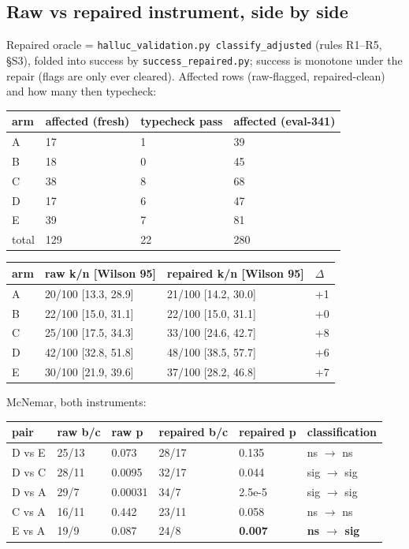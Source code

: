 \documentclass[10pt]{article}
\newcommand{\code}[1]{\texttt{#1}}
\newcommand{\best}[1]{\textbf{#1}}
\begin{document}
\subsection{Raw vs repaired instrument, side by side}\label{s2:rawrep}

Repaired oracle = \code{halluc\_validation.py classify\_adjusted}
(rules R1--R5, \S S3), folded into success by
\code{success\_repaired.py}; success is monotone under the repair
(flags are only ever cleared). Affected rows (raw-flagged,
repaired-clean) and how many then typecheck:

\begin{center}\footnotesize
\begin{tabular}{@{}llll@{}}
\toprule
arm & affected (fresh) & typecheck pass & affected (eval-341) \\
\midrule
A & 17 & 1 & 39 \\
B & 18 & 0 & 45 \\
C & 38 & 8 & 68 \\
D & 17 & 6 & 47 \\
E & 39 & 7 & 81 \\
total & 129 & 22 & 280 \\
\bottomrule
\end{tabular}
\end{center}

\begin{center}\footnotesize
\begin{tabular}{@{}llll@{}}
\toprule
arm & raw k/n [Wilson 95] & repaired k/n [Wilson 95] & $\Delta$ \\
\midrule
A & 20/100 [13.3, 28.9] & 21/100 [14.2, 30.0] & +1 \\
B & 22/100 [15.0, 31.1] & 22/100 [15.0, 31.1] & +0 \\
C & 25/100 [17.5, 34.3] & 33/100 [24.6, 42.7] & +8 \\
D & 42/100 [32.8, 51.8] & 48/100 [38.5, 57.7] & +6 \\
E & 30/100 [21.9, 39.6] & 37/100 [28.2, 46.8] & +7 \\
\bottomrule
\end{tabular}
\end{center}

McNemar, both instruments:

\begin{center}\footnotesize
\begin{tabular}{@{}llllll@{}}
\toprule
pair & raw b/c & raw p & repaired b/c & repaired p & classification \\
\midrule
D vs E & 25/13 & 0.073 & 28/17 & 0.135 & ns $\to$ ns \\
D vs C & 28/11 & 0.0095 & 32/17 & 0.044 & sig $\to$ sig \\
D vs A & 29/7 & 0.00031 & 34/7 & 2.5e-5 & sig $\to$ sig \\
C vs A & 16/11 & 0.442 & 23/11 & 0.058 & ns $\to$ ns \\
E vs A & 19/9 & 0.087 & 24/8 & \best{0.007} & \best{ns $\to$ sig} \\
\bottomrule
\end{tabular}
\end{center}
\end{document}

